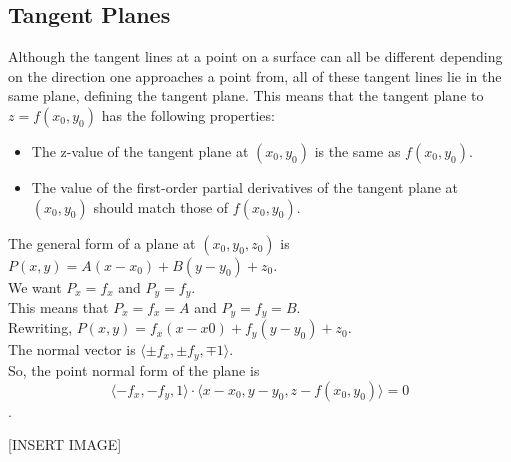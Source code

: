 \subsection{Tangent Planes}
\noindent
Although the tangent lines at a point on a surface can all be different depending on the direction one approaches a point from, all of these tangent lines lie in the same plane, defining the tangent plane. This means that the tangent plane to $z=f(x_0,y_0)$ has the following properties:
\begin{itemize}
	\item The z-value of the tangent plane at $(x_0,y_0)$ is the same as $f(x_0,y_0)$.
	\item The value of the first-order partial derivatives of the tangent plane at $(x_0,y_0)$ should match those of $f(x_0,y_0)$.
\end{itemize}

\noindent
The general form of a plane at $(x_0,y_0,z_0)$ is $P(x,y)=A(x-x_0)+B(y-y_0)+z_0$.\\ 
We want $P_x=f_x$ and $P_y=f_y$.\\
This means that $P_x=f_x=A$ and $P_y=f_y=B$.\\
Rewriting, $P(x,y)=f_x(x-x0)+f_y(y-y_0)+z_0$.\\
The normal vector is $\langle \pm f_x,\pm f_y, \mp 1\rangle$.\\
So, the point normal form of the plane is $$\langle -f_x, -f_y, 1\rangle\cdot\langle x-x_0, y-y_0, z-f(x_0,y_0)\rangle=0$$.

[INSERT IMAGE]
